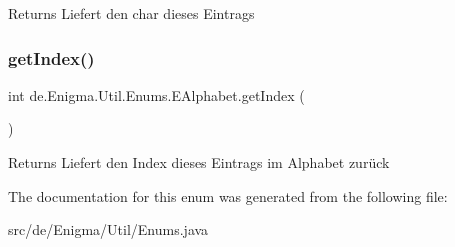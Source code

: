 \begin{DoxyReturn}{Returns}
Liefert den char dieses Eintrags 
\end{DoxyReturn}
\mbox{\label{enumde_1_1_enigma_1_1_util_1_1_enums_1_1_e_alphabet_a9e9983168faaf9bb24090c3870ebbfa4}} 
\subsubsection{\texorpdfstring{get\+Index()}{getIndex()}}
{\footnotesize\ttfamily int de.\+Enigma.\+Util.\+Enums.\+E\+Alphabet.\+get\+Index (\begin{DoxyParamCaption}{ }\end{DoxyParamCaption})}

\begin{DoxyReturn}{Returns}
Liefert den Index dieses Eintrags im Alphabet zurück 
\end{DoxyReturn}


The documentation for this enum was generated from the following file\+:\begin{DoxyCompactItemize}
\item 
src/de/\+Enigma/\+Util/Enums.\+java\end{DoxyCompactItemize}
